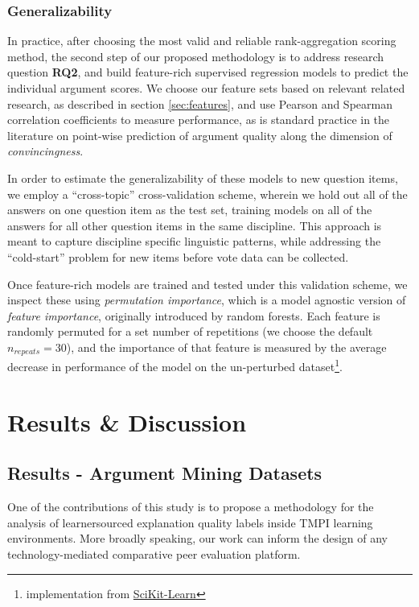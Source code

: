 \documentclass[notitlepage,12pt]{jedm}
\begin{document}
\subsubsection{Generalizability}
In practice, after choosing the most valid and reliable rank-aggregation 
scoring method, the second step of our proposed methodology is to address 
research question \textbf{RQ2}, and build feature-rich supervised regression 
models to predict the individual argument scores.
We choose our feature sets based on relevant related research, as described in 
section \ref{sec:features}, and use Pearson and Spearman correlation 
coefficients to measure performance, as is standard practice in the literature 
on point-wise prediction of argument quality along the dimension of 
\textit{convincingness}. 
 
In order to estimate the generalizability of these models to new question 
items, we employ a ``cross-topic'' cross-validation scheme, wherein we hold out 
all of the answers on one question item as the test set, training models on all 
of the answers for all other question items in the same discipline.
This approach is meant to capture discipline specific linguistic patterns, 
while addressing the ``cold-start'' problem for new items before vote data 
can be collected.

Once feature-rich models are trained and tested under this validation scheme, 
we inspect these using \textit{permutation importance}\cite{fisher_all_2019}, 
which is a model agnostic version of \textit{feature importance}, originally 
introduced by  random forests. 
Each feature is randomly permuted for a set number of repetitions (we choose 
the default $n_{repeats}=30$), and the importance of that feature is measured 
by the average decrease in performance of the model on the un-perturbed 
dataset\footnote{implementation from 
\href{https://scikit-learn.org/stable/modules/permutation_importance.html}{SciKit-Learn}}.



\section{Results \& Discussion}\label{sec:model_results}

\subsection{Results - Argument Mining Datasets}
One of the contributions of this study is to propose a methodology for the 
analysis of learnersourced explanation quality labels inside TMPI learning 
environments. 
More broadly speaking, our work can inform the design of any 
technology-mediated comparative peer evaluation platform. 
\end{document}

